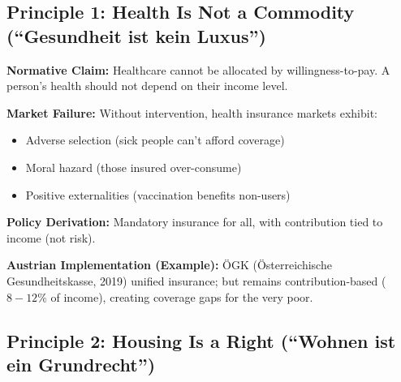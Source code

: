 
\subsection{Principle 1: Health Is Not a Commodity (``Gesundheit ist kein Luxus'')}

\begin{tcolorbox}[colback=gray!5!white, colframe=gray!75!black,
    title=Principle BF-1: Health Universality]

\textbf{Normative Claim:} Healthcare cannot be allocated by willingness-to-pay. A person's health should not depend on their income level.

\textbf{Market Failure:} Without intervention, health insurance markets exhibit:
\begin{itemize}[nosep]
\item Adverse selection (sick people can't afford coverage)
\item Moral hazard (those insured over-consume)
\item Positive externalities (vaccination benefits non-users)
\end{itemize}

\textbf{Policy Derivation:} Mandatory insurance for all, with contribution tied to income (not risk).

\textbf{Austrian Implementation (Example):} ÖGK (Österreichische Gesundheitskasse, 2019) unified insurance; but remains contribution-based ($8-12\%$ of income), creating coverage gaps for the very poor.

\end{tcolorbox}


\subsection{Principle 2: Housing Is a Right (``Wohnen ist ein Grundrecht'')}

